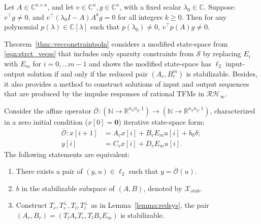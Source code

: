 \begin{lemma}\label{lm:poly_nonzero_inner_product}
Let \( A \in \mathbb{C}^{n \times n} \), and let \( v\in \mathbb{C}^n, g\in  \mathbb{C}^n\), with a fixed scalar \( \lambda_0 \in \mathbb{C} \). Suppose:
\( v^\top g \neq 0 \), and \( v^\top (\lambda_0 I - A) A^k g = 0 \) for all integers \( k \geq 0 \).
Then for any polynomial \( p(\lambda) \in \mathbb{C}[\lambda] \) such that \( p(\lambda_0) \neq 0 \), \(v^\top p(A) g \neq 0\).
\end{lemma}

Theorem~\ref{thm::vecconstraintsoln} considers a modified state-space from \eqref{eqn:strct_vecss} that includes only sparsity constraints from \(\mathcal{S}\) by replacing \(E_i\) with \(E_m\) for \(i = 0, \hdots m - 1\) and shows the modified state-space has \(\ell_2\) input-output solution if and only if the reduced pair \((A_r, B_r^m)\) is stabilizable. Besides, it also provides a method to construct solutions of input and output sequences that are produced by the impulse responses of rational TFMs in \(\mathcal{RH}_\infty\).  
\begin{thm}\label{thm::vecconstraintsoln}

Consider the affine operator 
\(\bar{\mathcal{O}} : \left( \mathbb{N} \to \mathbb{R}^{n_u n_y, 1} \right) \to \left( \mathbb{N} \to \mathbb{R}^{n_u n_y, 1} \right)\), characterized in a zero initial condition (\(x[0] =\mathbf{0}\)) iterative state-space form:
\begin{equation}\label{eqn:strct_vecss_m}
\begin{split}
    \bar{\mathcal{O}} \colon x[i+1] &=A_v x[i] + B_v E_m u[i] + b_0 \delta;\ \\
    y[i] &= C_v x[i] + D_v E_m u[i].
\end{split}
\end{equation}
The following statements are equivalent:
\begin{enumerate}\label{enum:maintheorem}
    \item \label{enuitem1} There exists a pair of \((y,u) \in \ell_2\) such that \(y = \bar{\mathcal{O}}(u)\).
    \item \label{enuitem2} \(b\) in the stabilizable subspace of $(A,B)$, denoted by \(\mathcal{X}_{stab}\).
    \item \label{enuitem3} Construct \(T_r, T_r^\perp, T_l, T_l^\perp\) as in Lemma~\ref{lemma:redsys}, the pair \((A_r ,B_r) = (T_l A_v T_r, T_l B_v E_m)\) is stabilizable.
\end{enumerate}
\end{thm}


